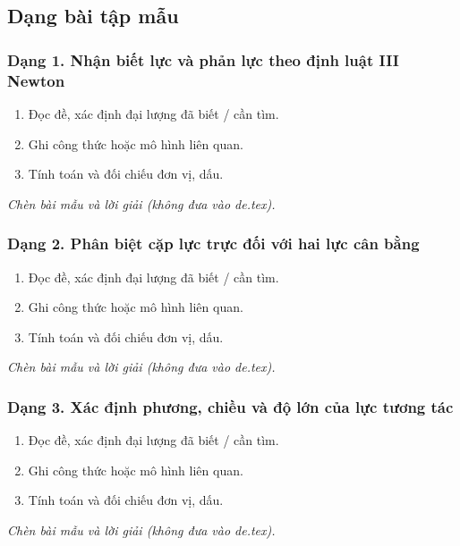 

\subsection{Dạng bài tập mẫu}
\subsubsection{Dạng 1. Nhận biết lực và phản lực theo định luật III Newton}
\begin{phuongphap}
\begin{enumerate}
\item Đọc đề, xác định đại lượng đã biết / cần tìm.
\item Ghi công thức hoặc mô hình liên quan.
\item Tính toán và đối chiếu đơn vị, dấu.
\end{enumerate}
\end{phuongphap}
\begin{vidumau}
\textit{Chèn bài mẫu và lời giải (không đưa vào de.tex).}
\end{vidumau}

\subsubsection{Dạng 2. Phân biệt cặp lực trực đối với hai lực cân bằng}
\begin{phuongphap}
\begin{enumerate}
\item Đọc đề, xác định đại lượng đã biết / cần tìm.
\item Ghi công thức hoặc mô hình liên quan.
\item Tính toán và đối chiếu đơn vị, dấu.
\end{enumerate}
\end{phuongphap}
\begin{vidumau}
\textit{Chèn bài mẫu và lời giải (không đưa vào de.tex).}
\end{vidumau}

\subsubsection{Dạng 3. Xác định phương, chiều và độ lớn của lực tương tác}
\begin{phuongphap}
\begin{enumerate}
\item Đọc đề, xác định đại lượng đã biết / cần tìm.
\item Ghi công thức hoặc mô hình liên quan.
\item Tính toán và đối chiếu đơn vị, dấu.
\end{enumerate}
\end{phuongphap}
\begin{vidumau}
\textit{Chèn bài mẫu và lời giải (không đưa vào de.tex).}
\end{vidumau}


